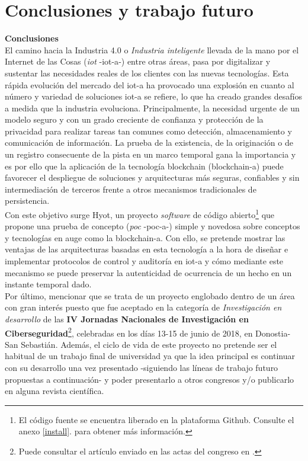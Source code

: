 \documentclass[12pt,a4paper, twoside]{report}
\begin{document}
	\chapter*{Conclusiones y trabajo futuro} \label{conclusions}
	
	{\Large\textbf{Conclusiones}} \\
	
	El camino hacia la Industria 4.0 o \textit{Industria inteligente} llevada de la mano por el Internet de las Cosas (\textit{\gls{iot}} -\gls{iot-a}-) entre otras áreas, pasa por digitalizar y sustentar las necesidades reales de los clientes con las nuevas tecnologías. Esta rápida evolución del mercado del \gls{iot-a} ha provocado una explosión en cuanto al número y variedad de soluciones \gls{iot-a} se refiere, lo que ha creado grandes desafíos a medida que la industria evoluciona. Principalmente, la necesidad urgente de un modelo seguro y con un grado creciente de confianza y protección de la privacidad para realizar tareas tan comunes como detección, almacenamiento y comunicación de información. La prueba de la existencia, de la originación o de un registro consecuente de la pista en un marco temporal gana la importancia y es por ello que la aplicación de la tecnología \Gls{blockchain} (\gls{blockchain-a}) puede favorecer el despliegue de soluciones y arquitecturas más seguras, confiables y sin intermediación de terceros frente a otros mecanismos tradicionales de persistencia. \\
	
	Con este objetivo surge Hyot, un proyecto \textit{software} de código abierto\footnote{El código fuente se encuentra liberado en la plataforma Github. Consulte el anexo \ref{install}.  para obtener más información.} que propone una prueba de concepto (\textit{\gls{poc}} -\gls{poc-a}-) simple y novedosa sobre conceptos y tecnologías en auge como la \gls{blockchain-a}. Con ello, se pretende mostrar las ventajas de las arquitecturas basadas en esta tecnología a la hora de diseñar e implementar protocolos de control y auditoría en \gls{iot-a} y cómo mediante este mecanismo se puede preservar la autenticidad de ocurrencia de un hecho en un instante temporal dado. \\

	Por último, mencionar que se trata de un proyecto englobado dentro de un área con gran interés puesto que fue aceptado en la categoría de \textit{Investigación en desarrollo} de las \textbf{IV Jornadas Nacionales de Investigación en Ciberseguridad}\footnote{Puede consultar el artículo enviado en las actas del congreso en \cite{jnic2018}.}, celebradas en los días 13-15 de junio de 2018, en Donostia-San Sebastián. Además, el ciclo de vida de este proyecto no pretende ser el habitual de un trabajo final de universidad ya que la idea principal es continuar con su desarrollo una vez presentado -siguiendo las líneas de trabajo futuro propuestas a continuación- y poder presentarlo a otros congresos y/o publicarlo en alguna revista científica. \\
				
\end{document}
